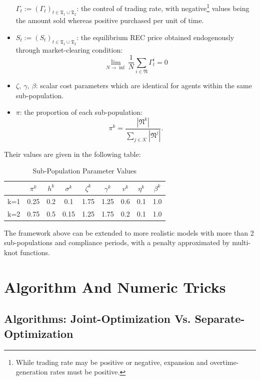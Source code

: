 \documentclass[a4paper,10pt]{article}
\newcommand{\1}{\mathbf{1}}
\begin{document}
\begin{itemize}
  \(\Gamma_t := (\Gamma_t)_{t\in\mathfrak{T_1} \cup \mathfrak{T_2}}\):
  the control of trading rate, with negative\footnote{While trading rate
    may be positive or negative, expansion and overtime-generation rates
    must be positive.} values being the amount sold whereas positive
  purchased per unit of time.
\item
  \(S_t := (S_t)_{t\in\mathfrak{T_1} \cup \mathfrak{T_2}}\): the
  equilibrium REC price obtained endogenously through market-clearing
  condition:
  \[\lim\limits_{N \to \inf}{\frac{1}{N} \sum\limits_{i\in\mathfrak{N}}{\Gamma^i_t}}=0\]
\item
  \(\zeta,~\gamma,~\beta\): scalar cost parameters which are identical
  for agents within the same sub-population.
\item
  \(\pi\): the proportion of each sub-population:
  \[\pi^k=\frac{|\mathfrak{N}^k|}{\sum\limits_{j \in \mathcal{K}}{|\mathfrak{N}^j|}}.\]
\end{itemize}

Their values are given in the following table:

\begin{table}[ht]
    \centering
    \begin{tabular}{*{9}{c}}
        \toprule
        \, & $\pi^k$ & $h^k$ & $\sigma^k$ & $\zeta^k$ & $\gamma^k$ & $v^k$ & $\eta^k$ & $\beta^k$ \\
        \midrule
        k=1 & 0.25 & 0.2 & 0.1  & 1.75 & 1.25 & 0.6 & 0.1 & 1.0 \\
        k=2 & 0.75 & 0.5 & 0.15 & 1.25 & 1.75 & 0.2 & 0.1 & 1.0 \\
        \toprule
    \end{tabular}
    \caption{Sub-Population Parameter Values}
    \label{tab:Params}
\end{table}

The framework above can be extended to more realistic models with more
than 2 sub-populations and compliance periods, with a penalty approximated
by multi-knot functions.

\section{Algorithm And Numeric
Tricks}

\subsection{Algorithms: Joint-Optimization Vs.
Separate-Optimization}
\end{document}
